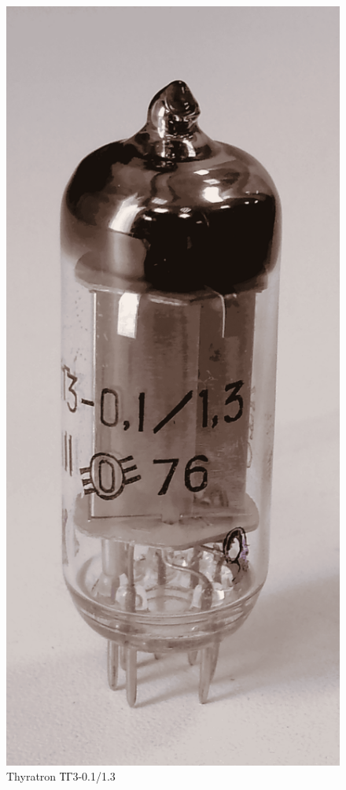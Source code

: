 \documentclass{beamer}
\begin{document}
\begin{frame}
\begin{columns}
\begin{figure}
				\includegraphics[width=\linewidth]{res/tirat_xe.png}
				\caption*{Thyratron ТГ3-0.1/1.3}
			\end{figure}
		\end{columns}
	\end{frame}	
	
\end{document}
